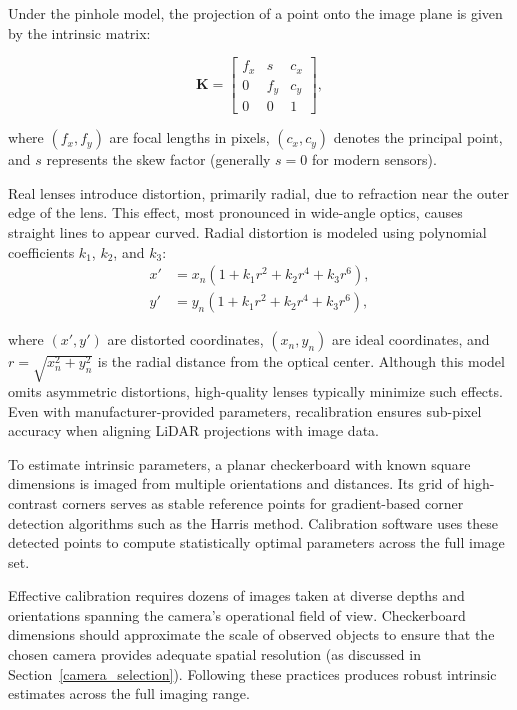 \documentclass[../main.tex]{subfiles}
\begin{document}
Under the pinhole model, the projection of a point onto the image plane is given by the intrinsic matrix:

\begin{equation}
    \mathbf{K} = 
    \begin{bmatrix}
        f_x & s & c_x \\
        0 & f_y & c_y \\
        0 & 0 & 1
    \end{bmatrix},
\end{equation}

where $(f_x, f_y)$ are focal lengths in pixels, $(c_x, c_y)$ denotes the principal point, and $s$ represents the skew factor (generally $s=0$ for modern sensors).

Real lenses introduce distortion, primarily radial, due to refraction near the outer edge of the lens.  
This effect, most pronounced in wide-angle optics, causes straight lines to appear curved.  
Radial distortion is modeled using polynomial coefficients $k_1$, $k_2$, and $k_3$:
\begin{equation}
    \begin{split}
        x' &= x_n(1 + k_1 r^2 + k_2 r^4 + k_3 r^6), \\
        y' &= y_n(1 + k_1 r^2 + k_2 r^4 + k_3 r^6),
    \end{split}
\end{equation}

where $(x', y')$ are distorted coordinates, $(x_n, y_n)$ are ideal coordinates, and $r = \sqrt{x_n^2 + y_n^2}$ is the radial distance from the optical center.  
Although this model omits asymmetric distortions, high-quality lenses typically minimize such effects.  
Even with manufacturer-provided parameters, recalibration ensures sub-pixel accuracy when aligning \ac{LiDAR} projections with image data.

To estimate intrinsic parameters, a planar checkerboard with known square dimensions is imaged from multiple orientations and distances.  
Its grid of high-contrast corners serves as stable reference points for gradient-based corner detection algorithms such as the Harris method.  
Calibration software uses these detected points to compute statistically optimal parameters across the full image set.

Effective calibration requires dozens of images taken at diverse depths and orientations spanning the camera’s operational field of view.  
Checkerboard dimensions should approximate the scale of observed objects to ensure that the chosen camera provides adequate spatial resolution (as discussed in Section~\ref{camera_selection}).  
Following these practices produces robust intrinsic estimates across the full imaging range.
\end{document}
